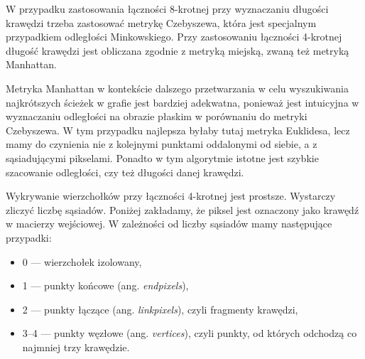 \documentclass[a4paper,11pt,twoside,openright]{report}
\theoremstyle{definition}
\begin{document}
W przypadku zastosowania łączności 8-krotnej przy wyznaczaniu długości krawędzi
trzeba zastosować metrykę Czebyszewa, która jest specjalnym przypadkiem
odległości Minkowskiego. Przy zastosowaniu łączności 4-krotnej długość krawędzi
jest obliczana zgodnie z metryką miejską, zwaną też metryką Manhattan.

Metryka Manhattan w kontekście dalszego przetwarzania w celu wyszukiwania
najkrótszych ścieżek w grafie jest bardziej adekwatna, ponieważ jest intuicyjna
w wyznaczaniu odległości na obrazie płaskim w porównaniu do metryki Czebyszewa.
W tym przypadku najlepsza byłaby tutaj metryka Euklidesa, lecz mamy do czynienia
nie z kolejnymi punktami oddalonymi od siebie, a z sąsiadującymi pikselami.
Ponadto w tym algorytmie istotne jest szybkie szacowanie odległości, czy też
długości danej krawędzi.

Wykrywanie wierzchołków przy łączności 4-krotnej jest prostsze. Wystarczy zliczyć
liczbę sąsiadów. Poniżej zakładamy, że piksel jest oznaczony jako krawędź w macierzy
wejściowej. W zależności od liczby sąsiadów mamy następujące przypadki:
\begin{itemize}[noitemsep]
\item 0 --- wierzchołek izolowany,
\item 1 --- punkty końcowe (ang. \textit{endpixels}),
\item 2 --- punkty łączące (ang. \textit{linkpixels}), czyli fragmenty krawędzi,
\item 3--4 --- punkty węzłowe (ang. \textit{vertices}), czyli punkty, od których odchodzą
co najmniej trzy krawędzie.
\end{itemize}
\end{document}
